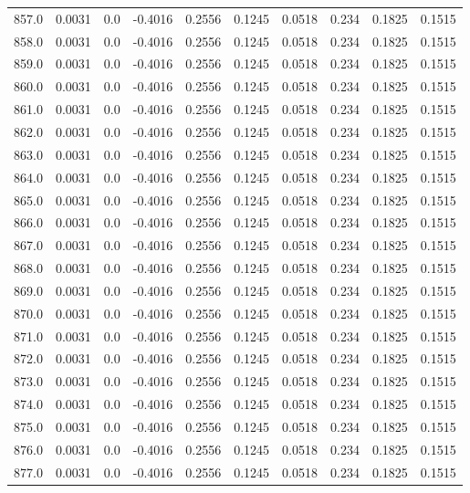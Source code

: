 \begin{longtable}{lrrrrrrrrr}
857.0 & 0.0031 & 0.0 & -0.4016 & 0.2556 & 0.1245 & 0.0518 & 0.234 & 0.1825 & 0.1515 \\
858.0 & 0.0031 & 0.0 & -0.4016 & 0.2556 & 0.1245 & 0.0518 & 0.234 & 0.1825 & 0.1515 \\
859.0 & 0.0031 & 0.0 & -0.4016 & 0.2556 & 0.1245 & 0.0518 & 0.234 & 0.1825 & 0.1515 \\
860.0 & 0.0031 & 0.0 & -0.4016 & 0.2556 & 0.1245 & 0.0518 & 0.234 & 0.1825 & 0.1515 \\
861.0 & 0.0031 & 0.0 & -0.4016 & 0.2556 & 0.1245 & 0.0518 & 0.234 & 0.1825 & 0.1515 \\
862.0 & 0.0031 & 0.0 & -0.4016 & 0.2556 & 0.1245 & 0.0518 & 0.234 & 0.1825 & 0.1515 \\
863.0 & 0.0031 & 0.0 & -0.4016 & 0.2556 & 0.1245 & 0.0518 & 0.234 & 0.1825 & 0.1515 \\
864.0 & 0.0031 & 0.0 & -0.4016 & 0.2556 & 0.1245 & 0.0518 & 0.234 & 0.1825 & 0.1515 \\
865.0 & 0.0031 & 0.0 & -0.4016 & 0.2556 & 0.1245 & 0.0518 & 0.234 & 0.1825 & 0.1515 \\
866.0 & 0.0031 & 0.0 & -0.4016 & 0.2556 & 0.1245 & 0.0518 & 0.234 & 0.1825 & 0.1515 \\
867.0 & 0.0031 & 0.0 & -0.4016 & 0.2556 & 0.1245 & 0.0518 & 0.234 & 0.1825 & 0.1515 \\
868.0 & 0.0031 & 0.0 & -0.4016 & 0.2556 & 0.1245 & 0.0518 & 0.234 & 0.1825 & 0.1515 \\
869.0 & 0.0031 & 0.0 & -0.4016 & 0.2556 & 0.1245 & 0.0518 & 0.234 & 0.1825 & 0.1515 \\
870.0 & 0.0031 & 0.0 & -0.4016 & 0.2556 & 0.1245 & 0.0518 & 0.234 & 0.1825 & 0.1515 \\
871.0 & 0.0031 & 0.0 & -0.4016 & 0.2556 & 0.1245 & 0.0518 & 0.234 & 0.1825 & 0.1515 \\
872.0 & 0.0031 & 0.0 & -0.4016 & 0.2556 & 0.1245 & 0.0518 & 0.234 & 0.1825 & 0.1515 \\
873.0 & 0.0031 & 0.0 & -0.4016 & 0.2556 & 0.1245 & 0.0518 & 0.234 & 0.1825 & 0.1515 \\
874.0 & 0.0031 & 0.0 & -0.4016 & 0.2556 & 0.1245 & 0.0518 & 0.234 & 0.1825 & 0.1515 \\
875.0 & 0.0031 & 0.0 & -0.4016 & 0.2556 & 0.1245 & 0.0518 & 0.234 & 0.1825 & 0.1515 \\
876.0 & 0.0031 & 0.0 & -0.4016 & 0.2556 & 0.1245 & 0.0518 & 0.234 & 0.1825 & 0.1515 \\
877.0 & 0.0031 & 0.0 & -0.4016 & 0.2556 & 0.1245 & 0.0518 & 0.234 & 0.1825 & 0.1515 \\

\end{longtable}
